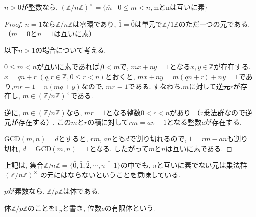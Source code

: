 \begin{tcolorbox}
	\begin{prp*}
		$n>0$が整数なら,
		$ (\mathbb{Z}/n\mathbb{Z})^\times 
		= \{\overline{m} \mid 0 \leq m < n, \text{mとnは互いに素} \}$
	\end{prp*}
\end{tcolorbox}
\begin{proof}
  $n=1$なら$\mathbb{Z}/n\mathbb{Z}$は零環であり,
  $\bar{1}=\bar{0}$は単元で$\mathbb{Z}/1\mathbb{Z}$のただ一つの元である.
（$m=0$と$n=1$は互いに素）

  以下$n>1$の場合について考える.

  $0\leq m < n$が互いに素であれば,$0<m$で,
  $mx + ny = 1$となる$x,y \in \mathbb{Z}$が存在する.
  $x=qn+r \; (q,r \in \mathbb{Z}, 0\leq r < n)$とおくと,
  $ mx + ny = m(qn+r) + ny = 1$であり,$mr = 1 - n(mq+y)$なので,
  $\bar{m}\bar{r} = \bar{1}$である.
  すなわち,$\bar{m}$に対して逆元$\bar{r}$が存在し,
  $\bar{m} \in (\mathbb{Z}/n\mathbb{Z})^\times$である.

  逆に, $m \in (\mathbb{Z}/n\mathbb{Z})$なら, 
  $\bar{m}\bar{r}=\bar{1}$となる整数$0<r<n$があり
  （$\because$乗法群なので逆元が存在する）,
  この$m$と$r$の積に対して$ rm = an +1$となる整数$a$が存在する.

  $\mathrm{GCD}(m,n)=d$とすると, $rm$, $an$とも$d$で割り切れるので,
  $1=rm-an$も割り切れ, $d=\mathrm{GCD}(m,n)=1$となる.
  したがって$m$と$n$は互いに素である.
\end{proof}

上記は, 集合$\mathbb{Z}/n\mathbb{Z}=\{\bar{0}, \bar{1},\bar{2},\cdots,\overline{n-1}\}$の中でも,
$n$と互いに素でない元は乗法群$(\mathbb{Z}/n\mathbb{Z})^\times$
の元にはならないということを意味している.\newline

\begin{tcolorbox}
	\begin{thm*}
		$p$が素数なら, $\mathbb{Z}/p\mathbb{Z}$は体である.
	\end{thm*}
\end{tcolorbox}

体$\mathbb{Z}/p\mathbb{Z}$のことを$ \mathbb{F}_p $と書き, 位数$p$の有限体という.


